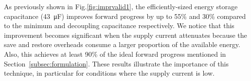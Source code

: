 As previously shown in Fig.\ref{fig:imprvalid1}, the efficiently-sized energy storage capacitance (\SI{43}{\micro\farad}) improves forward progress by up to 55\% and 30\% compared to the minimum and decoupling capacitance respectively. We notice that this improvement becomes significant when the supply current attenuates because the save and restore overheads consume a larger proportion of the available energy. Also, this achieves at least 90\% of the ideal forward progress mentioned in Section~\ref{subsec:formulation}. 
These results illustrate the importance of this technique, in particular for conditions where the supply current is low.